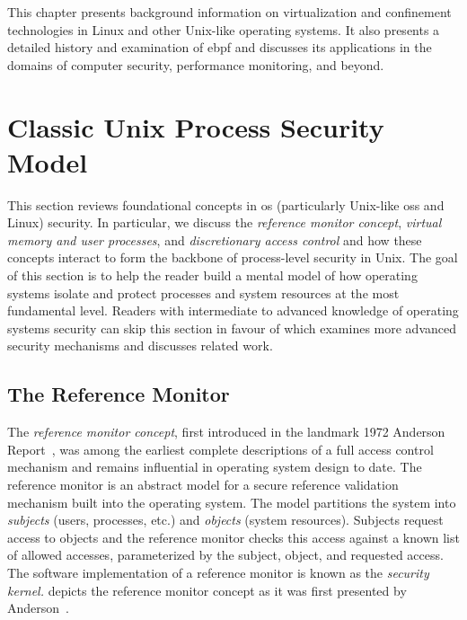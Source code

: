 \begin{inprogress}
  This chapter presents background information on virtualization and confinement
  technologies in Linux and other Unix-like operating systems. It also presents a detailed
  history and examination of \gls{ebpf} and discusses its applications in the domains of
  computer security, performance monitoring, and beyond.
\end{inprogress}

\section{Classic Unix Process Security Model}%
\label{s:process-security-model}

This section reviews foundational concepts in \gls{os} (particularly Unix-like \gls{os}s
and Linux) security. In particular, we discuss the \textit{reference monitor concept},
\textit{virtual memory and user processes}, and \textit{discretionary access control} and
how these concepts interact to form the backbone of process-level security in Unix.  The
goal of this section is to help the reader build a mental model of how operating systems
isolate and protect processes and system resources at the most fundamental level. Readers
with intermediate to advanced knowledge of operating systems security can skip this
section in favour of  which examines more advanced security
mechanisms and discusses related work.

\subsection{The Reference Monitor}%
\label{ss:refmon}

The \textit{reference monitor concept}, first introduced in the landmark 1972 Anderson
Report~\cite{anderson1972_report}, was among the earliest complete descriptions of a full
access control mechanism and remains influential in operating system design to date. The
reference monitor is an abstract model for a secure reference validation mechanism built
into the operating system. The model partitions the system into \textit{subjects} (users,
processes, etc.) and \textit{objects} (system resources).  Subjects request access to
objects and the reference monitor checks this access against a known list of allowed
accesses, parameterized by the subject, object, and requested access. The software
implementation of a reference monitor is known as the \textit{security kernel.}
 depicts the reference monitor concept as it was first presented by
Anderson~\cite{anderson1972_report}.

